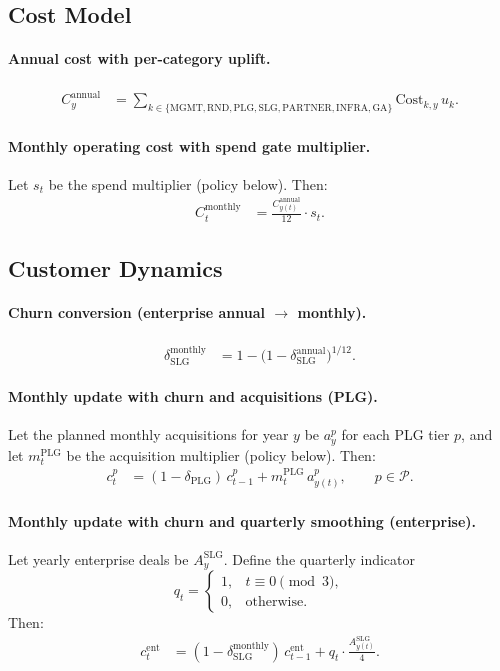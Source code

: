 \documentclass[11pt, a4paper, oneside]{article}
\begin{document}
\newpage
\subsection{Cost Model}
\paragraph{Annual cost with per-category uplift.}
\begin{align}
C^{\mathrm{annual}}_y 
  &= \sum_{k \in \{\mathrm{MGMT},\mathrm{RND},\mathrm{PLG},\mathrm{SLG},\mathrm{PARTNER},\mathrm{INFRA},\mathrm{GA}\}}
     \mathrm{Cost}_{k,y}\, u_k.
\end{align}

\paragraph{Monthly operating cost with spend gate multiplier.}
Let $s_t$ be the spend multiplier (policy below). Then:
\begin{align}
C^{\mathrm{monthly}}_t 
  &= \frac{C^{\mathrm{annual}}_{y(t)}}{12} \cdot s_t.
\end{align}

\subsection{Customer Dynamics}
\paragraph{Churn conversion (enterprise annual $\to$ monthly).}
\begin{align}
\delta^{\mathrm{monthly}}_{\mathrm{SLG}} 
  &= 1 - \bigl(1 - \delta^{\mathrm{annual}}_{\mathrm{SLG}}\bigr)^{1/12}.
\end{align}

\paragraph{Monthly update with churn and acquisitions (PLG).}
Let the planned monthly acquisitions for year $y$ be $a^p_y$ for each PLG tier $p$, and let $m^{\mathrm{PLG}}_t$ be the acquisition multiplier (policy below). Then:
\begin{align}
c^p_t 
  &= (1-\delta_{\mathrm{PLG}})\, c^p_{t-1} + m^{\mathrm{PLG}}_t \, a^p_{y(t)}, 
  \qquad p \in \mathcal{P}.
\end{align}

\paragraph{Monthly update with churn and quarterly smoothing (enterprise).}
Let yearly enterprise deals be $A^{\mathrm{SLG}}_{y}$. Define the quarterly indicator
\[
q_t = 
\begin{cases}
1, & t \equiv 0 \pmod{3},\\
0, & \text{otherwise}.
\end{cases}
\]
Then:
\begin{align}
c^{\mathrm{ent}}_t 
  &= (1-\delta^{\mathrm{monthly}}_{\mathrm{SLG}})\, c^{\mathrm{ent}}_{t-1}
     + q_t \cdot \frac{A^{\mathrm{SLG}}_{y(t)}}{4}.
\end{align}
\end{document}
